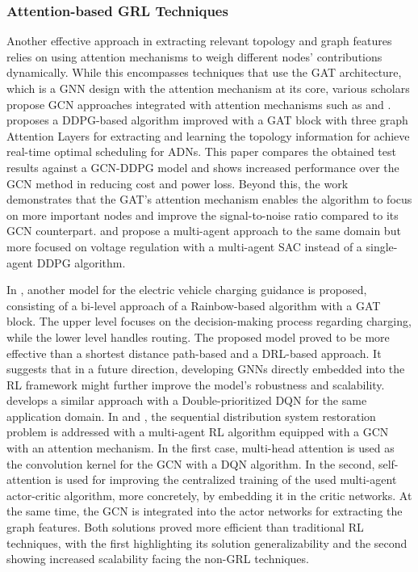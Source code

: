 \documentclass[11pt,a4paper]{article}
\begin{document}
\subsubsection{Attention-based GRL Techniques}
Another effective approach in extracting relevant topology and graph features relies on using attention mechanisms to weigh different nodes' contributions dynamically. While this encompasses techniques that use the \ac{GAT} architecture, which is a \ac{GNN} design with the attention mechanism at its core, various scholars propose \ac{GCN} approaches integrated with attention mechanisms such as \cite{zhaoLearningSequentialDistribution2022} and \cite{fanAttentionBasedMultiAgentGraph2023}.
\cite{xingRealtimeOptimalScheduling2023} proposes a \ac{DDPG}-based algorithm improved with a \ac{GAT} block with three graph Attention Layers for extracting and learning the topology information for achieve real-time optimal scheduling for \acp{ADN}. This paper compares the obtained test results against a \ac{GCN}-\ac{DDPG} model and shows increased performance over the \ac{GCN} method in reducing cost and power loss. Beyond this, the work demonstrates that the \ac{GAT}'s attention mechanism enables the algorithm to focus on more important nodes and improve the signal-to-noise ratio compared to its \ac{GCN} counterpart. \cite{chenPhysicalassistedMultiagentGraph2023} and propose a multi-agent approach to the same domain but more focused on voltage regulation with a multi-agent \ac{SAC} instead of a single-agent \ac{DDPG} algorithm. \par
In \cite{xingBilevelGraphReinforcement2023}, another model for the electric vehicle charging guidance is proposed, consisting of a bi-level approach of a Rainbow-based algorithm with a \ac{GAT} block. The upper level focuses on the decision-making process regarding charging, while the lower level handles routing. The proposed model proved to be more effective than a shortest distance path-based \cite{xingModellingDrivingCharging2021} and a \ac{DRL}-based \cite{qianDeepReinforcementLearning2020} approach. It suggests that in a future direction, developing \acp{GNN} directly embedded into the \ac{RL} framework might further improve the model's robustness and scalability. \cite{xuRealtimeFastCharging2022} develops a similar approach with a Double-prioritized DQN for the same application domain.
In \cite{zhaoLearningSequentialDistribution2022} and \cite{fanAttentionBasedMultiAgentGraph2023}, the sequential distribution system restoration problem is addressed with a multi-agent \ac{RL} algorithm equipped with a \ac{GCN} with an attention mechanism. In the first case, multi-head attention is used as the convolution kernel for the \ac{GCN} with a \ac{DQN} algorithm. In the second, self-attention is used for improving the centralized training of the used multi-agent actor-critic algorithm, more concretely, by embedding it in the critic networks. At the same time, the \ac{GCN} is integrated into the actor networks for extracting the graph features. Both solutions proved more efficient than traditional \ac{RL} techniques, with the first highlighting its solution generalizability and the second showing increased scalability facing the non-GRL techniques.
\end{document}
